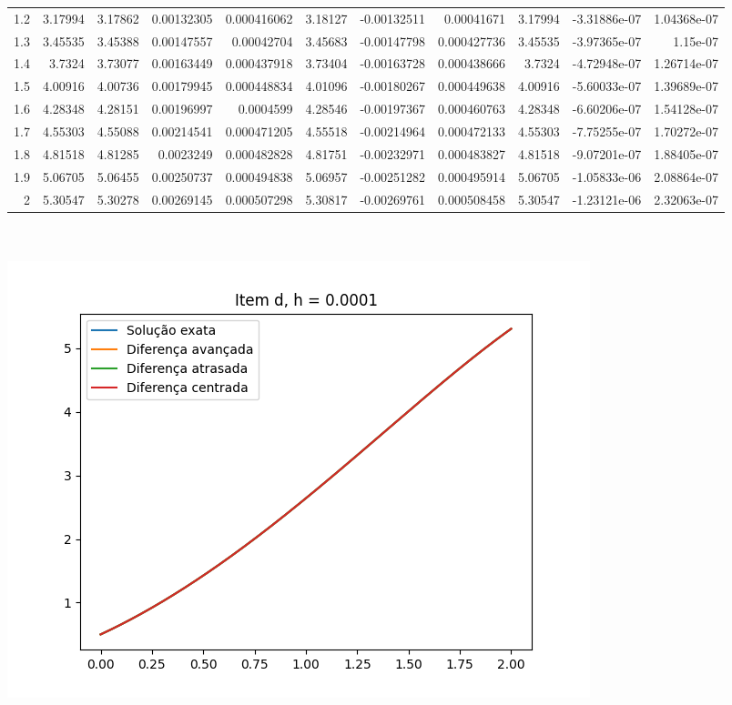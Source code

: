 {\begin{tabular}{rrrrrrrrrrr}
 1.2 & 3.17994  & 3.17862  &   0.00132305  &   0.000416062 & 3.18127  &  -0.00132511  &   0.00041671  & 3.17994  &  -3.31886e-07 &   1.04368e-07 \\
 1.3 & 3.45535  & 3.45388  &   0.00147557  &   0.00042704  & 3.45683  &  -0.00147798  &   0.000427736 & 3.45535  &  -3.97365e-07 &   1.15e-07    \\
 1.4 & 3.7324   & 3.73077  &   0.00163449  &   0.000437918 & 3.73404  &  -0.00163728  &   0.000438666 & 3.7324   &  -4.72948e-07 &   1.26714e-07 \\
 1.5 & 4.00916  & 4.00736  &   0.00179945  &   0.000448834 & 4.01096  &  -0.00180267  &   0.000449638 & 4.00916  &  -5.60033e-07 &   1.39689e-07 \\
 1.6 & 4.28348  & 4.28151  &   0.00196997  &   0.0004599   & 4.28546  &  -0.00197367  &   0.000460763 & 4.28348  &  -6.60206e-07 &   1.54128e-07 \\
 1.7 & 4.55303  & 4.55088  &   0.00214541  &   0.000471205 & 4.55518  &  -0.00214964  &   0.000472133 & 4.55303  &  -7.75255e-07 &   1.70272e-07 \\
 1.8 & 4.81518  & 4.81285  &   0.0023249   &   0.000482828 & 4.81751  &  -0.00232971  &   0.000483827 & 4.81518  &  -9.07201e-07 &   1.88405e-07 \\
 1.9 & 5.06705  & 5.06455  &   0.00250737  &   0.000494838 & 5.06957  &  -0.00251282  &   0.000495914 & 5.06705  &  -1.05833e-06 &   2.08864e-07 \\
 2   & 5.30547  & 5.30278  &   0.00269145  &   0.000507298 & 5.30817  &  -0.00269761  &   0.000508458 & 5.30547  &  -1.23121e-06 &   2.32063e-07 \\
\hline
\end{tabular}
}
        \\
        \\
        \includegraphics{d_h_0.0001.png}
